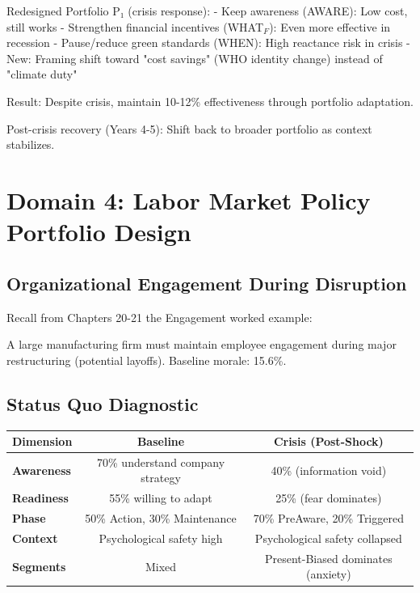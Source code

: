 Redesigned Portfolio P₁ (crisis response):
- Keep awareness (AWARE): Low cost, still works
- Strengthen financial incentives (WHAT$_F$): Even more effective in recession
- Pause/reduce green standards (WHEN): High reactance risk in crisis
- New: Framing shift toward "cost savings" (WHO identity change) instead of "climate duty"

Result: Despite crisis, maintain 10-12\% effectiveness through portfolio adaptation.

Post-crisis recovery (Years 4-5): Shift back to broader portfolio as context stabilizes.


\section{Domain 4: Labor Market Policy Portfolio Design}
\label{sec:labor-portfolio}

\subsection{Organizational Engagement During Disruption}

Recall from Chapters 20-21 the Engagement worked example:

A large manufacturing firm must maintain employee engagement during major restructuring (potential layoffs). Baseline morale: 15.6\%.

\subsection{Status Quo Diagnostic}

\begin{center}
\begin{tabular}{@{}lcc@{}}
\toprule
\textbf{Dimension} & \textbf{Baseline} & \textbf{Crisis (Post-Shock)} \\
\midrule
\textbf{Awareness} & 70\% understand company strategy & 40\% (information void) \\
\textbf{Readiness} & 55\% willing to adapt & 25\% (fear dominates) \\
\textbf{Phase} & 50\% Action, 30\% Maintenance & 70\% PreAware, 20\% Triggered \\
\textbf{Context} & Psychological safety high & Psychological safety collapsed \\
\textbf{Segments} & Mixed & Present-Biased dominates (anxiety) \\
\midrule
\end{tabular}
\end{center}


